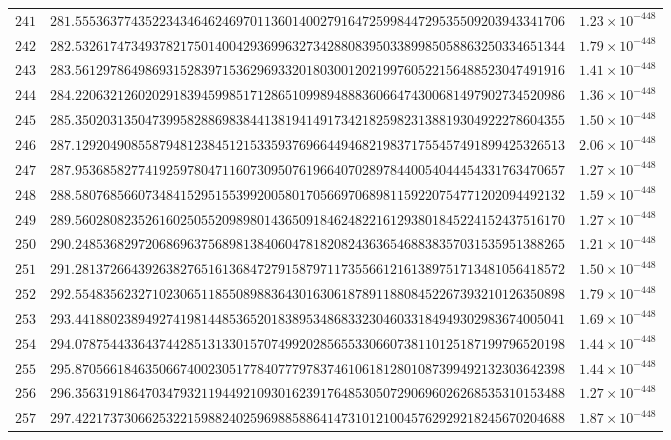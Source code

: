 \documentclass[12pt,reqno]{amsart}
\theoremstyle{remark}
\begin{document}
\begin{longtable}{clc}
$241$ & $281.5553637743522343464624697011360140027916472599844729535509203943341706$ & $1.23\times 10^{-448}$ \\
$242$ & $282.5326174734937821750140042936996327342880839503389985058863250334651344$ & $1.79\times 10^{-448}$ \\
$243$ & $283.5612978649869315283971536296933201803001202199760522156488523047491916$ & $1.41\times 10^{-448}$ \\
$244$ & $284.2206321260202918394599851712865109989488836066474300681497902734520986$ & $1.36\times 10^{-448}$ \\
$245$ & $285.3502031350473995828869838441381941491734218259823138819304922278604355$ & $1.50\times 10^{-448}$ \\
$246$ & $287.1292049085587948123845121533593769664494682198371755457491899425326513$ & $2.06\times 10^{-448}$ \\
$247$ & $287.9536858277419259780471160730950761966407028978440054044454331763470657$ & $1.27\times 10^{-448}$ \\
$248$ & $288.5807685660734841529515539920058017056697068981159220754771202094492132$ & $1.59\times 10^{-448}$ \\
$249$ & $289.5602808235261602505520989801436509184624822161293801845224152437516170$ & $1.27\times 10^{-448}$ \\
$250$ & $290.2485368297206869637568981384060478182082436365468838357031535951388265$ & $1.21\times 10^{-448}$ \\
$251$ & $291.2813726643926382765161368472791587971173556612161389751713481056418572$ & $1.50\times 10^{-448}$ \\
$252$ & $292.5548356232710230651185508988364301630618789118808452267393210126350898$ & $1.79\times 10^{-448}$ \\
$253$ & $293.4418802389492741981448536520183895348683323046033184949302983674005041$ & $1.69\times 10^{-448}$ \\
$254$ & $294.0787544336437442851313301570749920285655330660738110125187199796520198$ & $1.44\times 10^{-448}$ \\
$255$ & $295.8705661846350667400230517784077797837461061812801087399492132303642398$ & $1.44\times 10^{-448}$ \\
$256$ & $296.3563191864703479321194492109301623917648530507290696026268535310153488$ & $1.27\times 10^{-448}$ \\
$257$ & $297.4221737306625322159882402596988588641473101210045762929218245670204688$ & $1.87\times 10^{-448}$ \\

\end{longtable}
\end{document}
